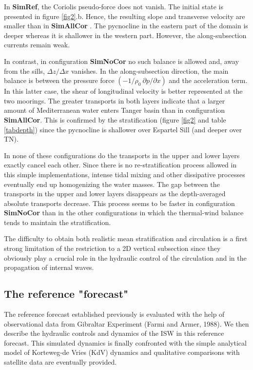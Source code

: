 In \textbf{SimRef}, the Coriolis pseudo-force does not vanish. The initial state is presented in figure \ref{fig2}.b. Hence, the resulting slope and transverse velocity are smaller than in \textbf{SimAllCor}%
. The pycnocline in the eastern part of the domain is deeper whereas it is shallower in the western part. However, the along-subsection currents remain weak.

In contrast, in configuration \textbf{SimNoCor} no such balance is allowed and, away from the sills, $\Delta z/\Delta x$ vanishes. In the along-subsection direction, the main balance is between the pressure force $(-1/\rho_0\  \partial p/\partial x)$ and the acceleration term. In this latter case, the shear of longitudinal velocity is better represented at the two moorings. The greater transports in both layers indicate that a larger amount of Mediterranean water enters Tanger basin than in configuration \textbf{SimAllCor}. This is confirmed by the stratification (figure \ref{fig2} and table \ref{tabdepth}) since the pycnocline is shallower over Espartel Sill (and deeper over TN).

In none of these configurations do the transports in the upper and lower layers exactly cancel each other. Since there is no re-stratification process allowed in this simple implementations, intense tidal mixing and other dissipative processes eventually end up homogenizing the water masses. The gap between the transports in the upper and lower layers  disappears as the depth-averaged absolute transports decrease. This process seems to be faster in configuration \textbf{SimNoCor} than in the other configurations in which the thermal-wind balance tends to maintain the stratification.

The difficulty to obtain both realistic mean stratification and circulation is a first strong limitation of the restriction to a 2D vertical subsection since they obviously play a crucial role in the hydraulic control of the circulation and in the propagation of internal waves.\\

\subsection{The reference "forecast"}

\indent The reference forecast  established previously is evaluated with the help of observational data from Gibraltar Experiment (Farmi and Armer, 1988). We then describe the hydraulic controls and dynamics of the ISW in this reference forecast. This simulated dynamics is finally confronted with the simple analytical model of Korteweg-de Vries (KdV) dynamics and qualitative comparisons with satellite data are eventually provided.

